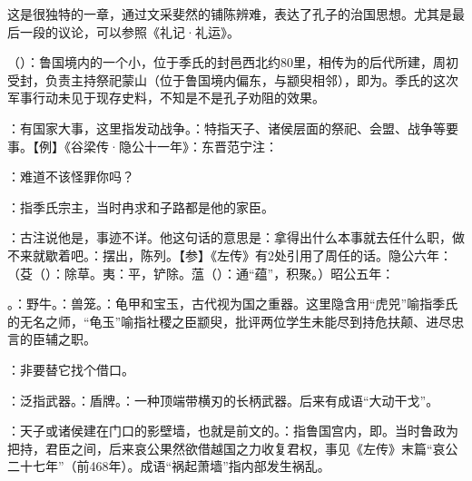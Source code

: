 {
这是很独特的一章，通过文采斐然的铺陈辨难，表达了孔子的治国思想。尤其是最后一段的议论，可以参照《礼记·礼运》。
\begin{lyitemize}
\item {}（）：鲁国境内的一个小，位于季氏的封邑西北约80里，相传为的后代所建，周初受封，负责主持祭祀蒙山（位于鲁国境内偏东，与颛臾相邻），即为。季氏的这次军事行动未见于现存史料，不知是不是孔子劝阻的效果。
\item {}：有国家大事，这里指发动战争。：特指天子、诸侯层面的祭祀、会盟、战争等要事。【例】《谷梁传·隐公十一年》：东晋范宁注：
\item {}：难道不该怪罪你吗？
\item {}：指季氏宗主，当时冉求和子路都是他的家臣。
\item {}：古注说他是，事迹不详。他这句话的意思是：拿得出什么本事就去任什么职，做不来就歇着吧。：摆出，陈列。【参】《左传》有2处引用了周任的话。隐公六年：（芟（）：除草。夷：平，铲除。蕰（）：通“蕴”，积聚。）昭公五年：

\item {}。：野牛。：兽笼。：龟甲和宝玉，古代视为国之重器。这里隐含用“虎兕”喻指季氏的无名之师，“龟玉”喻指社稷之臣颛臾，批评两位学生未能尽到持危扶颠、进尽忠言的臣辅之职。
\item {}：非要替它找个借口。
\item {}：泛指武器。：盾牌。：一种顶端带横刃的长柄武器。后来有成语“大动干戈”。

\item {}：天子或诸侯建在门口的影壁墙，也就是前文的。：指鲁国宫内，即。当时鲁政为把持，君臣之间，后来哀公果然欲借越国之力收复君权，事见《左传》末篇“哀公二十七年”（前468年）。成语“祸起萧墙”指内部发生祸乱。
\end{lyitemize}
}
{}


